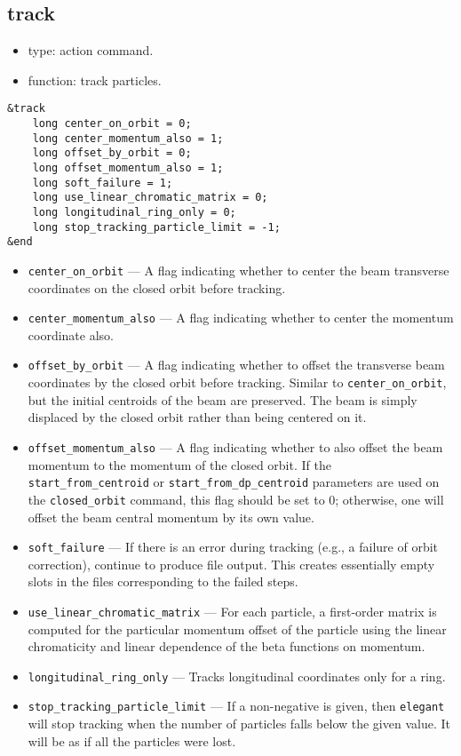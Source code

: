 \documentclass[11pt]{article}
\begin{document}
\subsection{track \label{subsec:track}}

\begin{itemize}
\item type: action command.
\item function: track particles.
\end{itemize}

\begin{verbatim}
&track
    long center_on_orbit = 0;
    long center_momentum_also = 1;
    long offset_by_orbit = 0;
    long offset_momentum_also = 1;
    long soft_failure = 1;
    long use_linear_chromatic_matrix = 0;
    long longitudinal_ring_only = 0;
    long stop_tracking_particle_limit = -1;
&end
\end{verbatim}

\begin{itemize}
\item \verb|center_on_orbit| --- A flag indicating whether to center
the beam transverse coordinates on the closed orbit before tracking.
\item \verb|center_momentum_also| --- A flag indicating whether to
center the momentum coordinate also.
\item \verb|offset_by_orbit| --- A flag indicating whether to offset
the transverse beam coordinates by the closed orbit before tracking.
Similar to \verb|center_on_orbit|, but the initial centroids of the
beam are preserved.  The beam is simply displaced by the closed orbit
rather than being centered on it.
\item \verb|offset_momentum_also| --- A flag indicating whether to also
offset the beam momentum to the momentum of the closed orbit.  If the
\verb|start_from_centroid| or \verb|start_from_dp_centroid| parameters are 
used on the \verb|closed_orbit| command, this flag should be set to
0; otherwise, one will offset the beam central momentum by its own value.
\item \verb|soft_failure| --- If there is an error during tracking (e.g.,
a failure of orbit correction), continue to produce file output.  This
creates essentially empty slots in the files corresponding to the failed
steps.
\item \verb|use_linear_chromatic_matrix| --- For each particle, a first-order
matrix is computed for the particular momentum offset 
of the particle using the linear chromaticity and linear dependence of 
the beta functions on momentum.
\item \verb|longitudinal_ring_only| --- Tracks longitudinal coordinates only
for a ring.  
\item \verb|stop_tracking_particle_limit| --- If a non-negative is given, then
{\tt elegant} will stop tracking when the number of particles falls below the
given value.  It will be as if all the particles were lost.
\end{itemize}
\end{document}
